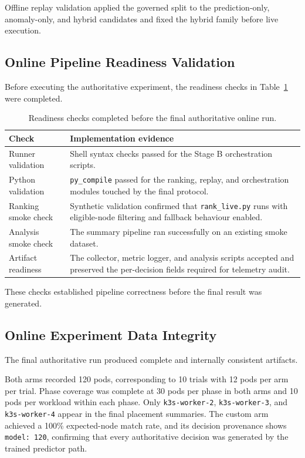 Offline replay validation applied the governed split to the prediction-only, anomaly-only, and hybrid candidates and fixed the hybrid family before live execution.


\subsection{Online Pipeline Readiness Validation}

Before executing the authoritative experiment, the readiness checks in Table~\ref{tab:ch3-readiness} were completed.

\begin{table}[h]
\centering
\small
\begin{tabular}{lp{8.8cm}}
\hline
\textbf{Check} & \textbf{Implementation evidence} \\
\hline
Runner validation & Shell syntax checks passed for the Stage B orchestration scripts. \\
Python validation & \texttt{py\_compile} passed for the ranking, replay, and orchestration modules touched by the final protocol. \\
Ranking smoke check & Synthetic validation confirmed that \texttt{rank\_live.py} runs with eligible-node filtering and fallback behaviour enabled. \\
Analysis smoke check & The summary pipeline ran successfully on an existing smoke dataset. \\
Artifact readiness & The collector, metric logger, and analysis scripts accepted and preserved the per-decision fields required for telemetry audit. \\
\hline
\end{tabular}
\caption{Readiness checks completed before the final authoritative online run.}
\label{tab:ch3-readiness}
\end{table}

These checks established pipeline correctness before the final result was generated.


\subsection{Online Experiment Data Integrity}

The final authoritative run produced complete and internally consistent artifacts.

Both arms recorded 120 pods, corresponding to 10 trials with 12 pods per arm per trial. Phase coverage was complete at 30 pods per phase in both arms and 10 pods per workload within each phase. Only \texttt{k3s-worker-2}, \texttt{k3s-worker-3}, and \texttt{k3s-worker-4} appear in the final placement summaries. The custom arm achieved a 100\% expected-node match rate, and its decision provenance shows \texttt{model: 120}, confirming that every authoritative decision was generated by the trained predictor path.

